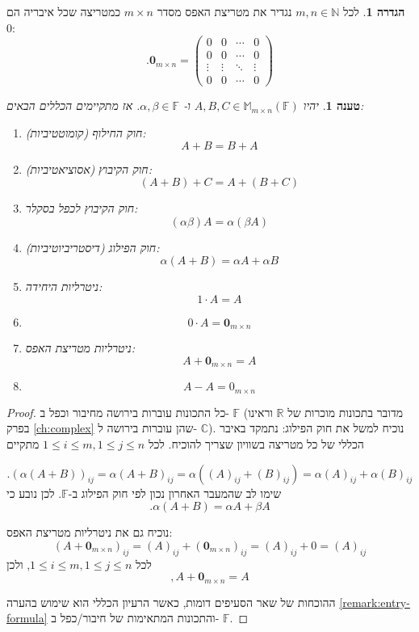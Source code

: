 \documentclass[12pt]{report}
\theoremstyle{plain}
\newtheorem{proposition}[theorem]{טענה}
\theoremstyle{definition}
\newtheorem{definition}[theorem]{הגדרה}
\newcommand{\R}{\mathbb{R}}
\newcommand{\N}{\mathbb{N}}
\newcommand{\C}{\mathbb{C}}
\newcommand{\F}{\mathbb{F}}
\newcommand{\M}{\mathbb{M}}
\newcommand{\0}{\mathbf{0}}
\begin{document}
\begin{definition}
לכל 
$m,n\in\N$
נגדיר את מטריצת האפס מסדר
$m\times n$
כמטריצה שכל איבריה הם
$0$:
$$
.\0_{m\times n}=\begin{pmatrix}0 &0 &\cdots &0 \\
0 &0 &\cdots &0 \\
\vdots & \vdots &\ddots &\vdots\\
0 &0 &\cdots &0
\end{pmatrix}
$$
\end{definition}

\begin{proposition}
יהיו 
$A,B,C\in\M_{m\times n}(\F)$
ו-
$\alpha,\beta\in\F$.
אז מתקיימים הכללים הבאים:

\begin{enumerate}[label=\alph*.]
\item
חוק החילוף (קומוטטיביות): 
$$A+B=B+A$$


\item 
חוק הקיבוץ (אסוציאטיביות):
$$(A+B)+C=A+(B+C)$$


\item 
חוק הקיבוץ לכפל בסקלר:
$$(\alpha\beta)A=\alpha(\beta A)$$


\item 
חוק הפילוג (דיסטריביוטיביות):
$$\alpha(A+B)=\alpha A+\alpha B$$


\item
ניטרליות היחידה:
$$1\cdot A=A$$


\item
$$0\cdot A=\0_{m\times n}$$


\item 
ניטרליות מטריצת האפס:
$$A+\0_{m\times n}=A$$


\item 
$$A-A=0_{m\times n}$$


\end{enumerate}
\end{proposition}

\begin{proof}
כל התכונות עוברות בירושה מחיבור וכפל ב-
$\F$
(מדובר בתכונות מוכרות של 
$\R$
וראינו בפרק 
\ref{ch:complex}
שהן עוברות בירושה ל-
$\C$).
נוכיח למשל את חוק הפילוג: נתמקד באיבר הכללי של כל מטריצה בשוויון שצריך להוכיח.
לכל
$1\leq i\leq m, 1\leq j\leq n$
מתקיים

$$
.(\alpha(A+B))_{ij}=\alpha(A+B)_{ij}=\alpha((A)_{ij}+(B)_{ij})=\alpha (A)_{ij}+\alpha (B)_{ij}
$$
שימו לב שהמעבר האחרון נכון לפי חוק הפילוג ב-$\F$.
לכן נובע כי
$$.\alpha(A+B)=\alpha A+\beta A$$

נוכיח גם את ניטרליות מטריצת האפס:
$$
(A+\0_{m\times n})_{ij}=(A)_{ij}+(\0_{m\times n})_{ij}=(A)_{ij}+0=(A)_{ij}
$$
לכל
$1\leq i\leq m, 1\leq j\leq n$,
ולכן
$$,A+\0_{m\times n}=A$$

ההוכחות של שאר הסעיפים דומות, כאשר הרעיון הכללי הוא שימוש בהערה
\ref{remark:entry-formula}
והתכונות המתאימות של חיבור/כפל ב-
$\F$.

\end{proof}
\end{document}
